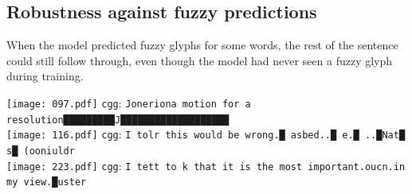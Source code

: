 \documentclass[11pt,twocolumn]{article}
\begin{document}
\subsection{Robustness against fuzzy predictions}\label{sec:robustn-against-fuzz}

When the model predicted fuzzy glyphs for some words,
the rest of the sentence could still follow through,
even though the model had never seen a fuzzy glyph during training.

\vspace{1.2em}\noindent\texttt{[image: 097.pdf]}
\texttt{cgg}: \texttt{Joneriona   motion for a resolution█████████J███████████████████}\\

\vspace{1.2em}\noindent\texttt{[image: 116.pdf]}
\texttt{cgg}: \texttt{I tolr  this would be wrong.█ asbed..█ e.█  ..█Nat█ s█ (ooniuldr}\\

\vspace{1.2em}\noindent\texttt{[image: 223.pdf]}
\texttt{cgg}: \texttt{I tett to k that it is the most important.oucn.in my view.█uster}\\
\end{document}
